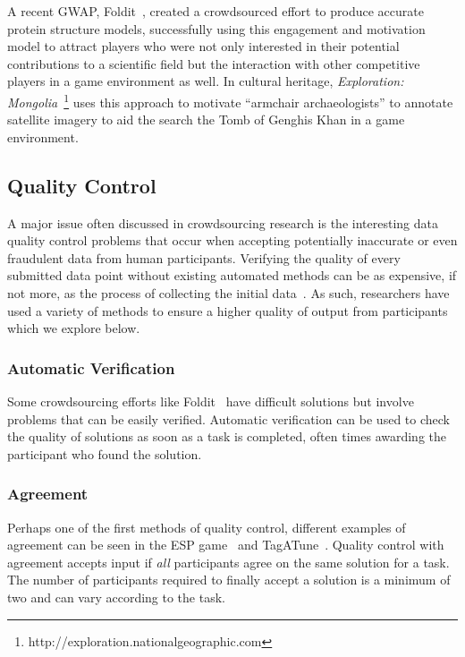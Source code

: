 \documentclass[10pt,twocolumn]{article}
\begin{document}
A recent GWAP, Foldit~\cite{Cooper2010}, created a crowdsourced effort to 
produce accurate protein structure models, successfully using this engagement
and motivation model to attract players who were not only interested in their 
potential contributions to a scientific field but the interaction with other competitive
players in a game environment as well. In cultural heritage, \textit{Exploration:
Mongolia}~\footnote{http://exploration.nationalgeographic.com} uses this approach
to motivate ``armchair archaeologists'' to annotate satellite imagery to aid
the search the Tomb of Genghis Khan in a game environment.

\subsection{Quality Control}
\label{sec:quality-control}

A major issue often discussed in crowdsourcing research is the interesting 
data quality control problems that occur when accepting potentially 
inaccurate or even fraudulent data from human participants. Verifying the
quality of every submitted data point without existing automated methods can 
be as expensive, if not more, as the process of collecting the initial 
data~\cite{Ipeirotis2010a}. As such, researchers have used a variety of 
methods to ensure a higher quality of output from participants which
we explore below.


\subsubsection*{Automatic Verification}

Some crowdsourcing efforts like Foldit~\cite{Cooper2010} have difficult
solutions but involve problems that can be easily verified. Automatic
verification can be used to check the quality of solutions as soon
as a task is completed, often times awarding the participant who
found the solution.


\subsubsection*{Agreement}
Perhaps one of the first methods of quality control, different examples of 
agreement can be seen in the ESP game~\cite{VonAhn2004} and 
TagATune~\cite{Law2009a}. Quality control with agreement accepts input 
if \textit{all} participants agree on the same solution for a task.
The number of participants required to finally accept a solution is
a minimum of two and can vary according to the task.
\end{document}
